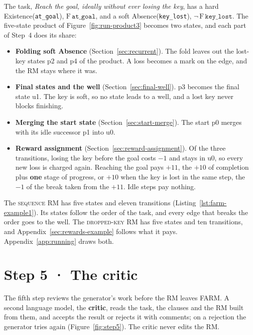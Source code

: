 \documentclass[11pt,english,listoffigures,listoftables]{tfgetsinf}
\newcommand{\runex}[1]{\textsc{#1}}  %
\newcommand{\gain}[1]{\textcolor{green!40!black}{\bfseries\boldmath #1}}  %
\newcommand{\loss}[1]{\textcolor{red!60!black}{\bfseries\boldmath #1}}  %
\begin{document}
The task, \textit{Reach the goal, ideally without ever losing the key}, has a hard Existence(\texttt{at\_goal}), $\mathrm{F}\,\texttt{at\_goal}$, and a soft Absence(\texttt{key\_lost}), $\neg\,\mathrm{F}\,\texttt{key\_lost}$. The five-state product of Figure~\ref{fig:run-product3} becomes two states, and each part of Step~4 does its share:
\begin{itemize}
    \item \textbf{Folding soft Absence} (Section~\ref{sec:recurrent}). The fold leaves out the lost-key states p2 and p4 of the product. A loss becomes a mark on the edge, and the RM stays where it was.
    \item \textbf{Final states and the well} (Section~\ref{sec:final-well}). p3 becomes the final state u1. The key is soft, so no state leads to a well, and a lost key never blocks finishing.
    \item \textbf{Merging the start state} (Section~\ref{sec:start-merge}). The start p0 merges with its idle successor p1 into u0.
    \item \textbf{Reward assignment} (Section~\ref{sec:reward-assignment}). Of the three transitions, losing the key before the goal costs \loss{$-1$} and stays in u0, so every new loss is charged again. Reaching the goal pays \gain{$+11$}, the \gain{$+10$} of completion plus \gain{one} stage of progress, or \gain{$+10$} when the key is lost in the same step, the \loss{$-1$} of the break taken from the $+11$. Idle steps pay nothing.
\end{itemize}

The \runex{sequence} RM has five states and eleven transitions (Listing~\ref{lst:farm-example1}). Its states follow the order of the task, and every edge that breaks the order goes to the well. The \runex{dropped-key} RM has five states and ten transitions, and Appendix~\ref{sec:rewards-example} follows what it pays. Appendix~\ref{app:running} draws both.

\section{Step 5 · The critic}
\label{sec:step5}
The fifth step reviews the generator's work before the RM leaves FARM. A second language model, the \textbf{critic}, reads the task, the clauses and the RM built from them, and accepts the result or rejects it with comments; on a rejection the generator tries again (Figure~\ref{fig:step5}). The critic never edits the RM.
\end{document}
